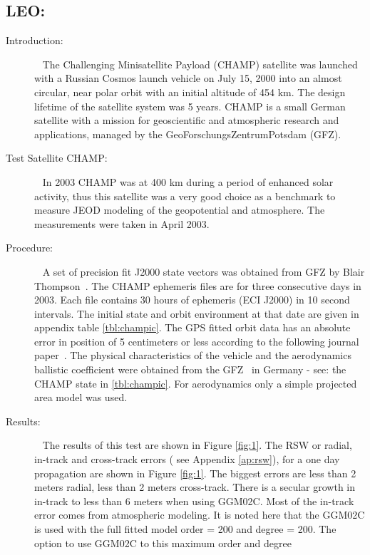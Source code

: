 \subsection{LEO:}
\label{test:champ}
\begin{description}
\item[Introduction:] \ \newline
The Challenging Minisatellite Payload (CHAMP) satellite was launched with a Russian
Cosmos launch vehicle on July 15, 2000 into an almost circular, near polar orbit with
an initial altitude of 454 km. The design lifetime of the satellite system  was 5 years.
CHAMP is a small German satellite with a mission for geoscientific and atmospheric
research and applications, managed by the GeoForschungsZentrumPotsdam (GFZ).
\item[Test Satellite CHAMP:] \ \newline
In 2003 CHAMP was at 400 km during a period of enhanced solar activity, thus this satellite
was a very good choice as a benchmark to measure JEOD modeling of the geopotential and
atmosphere. The measurements were taken in April 2003.
\item[Procedure:]\ \newline
A set of precision fit J2000 state vectors was obtained from GFZ by Blair Thompson~\cite{bt}.
The CHAMP ephemeris files are for three consecutive days in 2003.  Each file contains 30
hours of ephemeris (ECI J2000) in 10 second intervals.  The initial state and orbit environment
at that date are given in appendix table \ref{tbl:champic}.  The GPS fitted orbit data has an
absolute error in position of 5 centimeters or less according to the following journal paper~\cite{Bae}.
The physical characteristics of the vehicle and the aerodynamics ballistic coefficient were
obtained from the GFZ~\cite{G} in Germany -
see: the CHAMP state in \ref{tbl:champic}. For aerodynamics only a simple projected area model was used.
\item[Results:]\ \newline
The results of this test are shown in Figure \ref{fig:1}. The RSW or radial, in-track and
cross-track errors ( see Appendix \ref{ap:rsw}), for a one day propagation are shown in Figure \ref{fig:1}.
The biggest errors are less than 2 meters radial, less than 2 meters cross-track. There is a
secular growth in in-track to less than 6 meters when using GGM02C.  Most of the in-track error
comes from atmospheric modeling.  It is noted here that the GGM02C is used with the full fitted
model order = 200 and degree = 200.  The option to use GGM02C to this maximum order and degree

\end{description}
